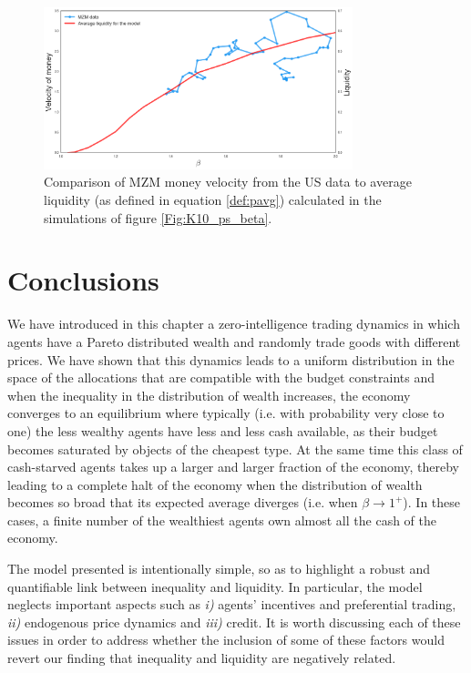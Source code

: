 \begin{figure}%
\centering
\includegraphics[width=0.8\textwidth]{figs_ineq/data_model.png}
\caption{Comparison of MZM money velocity from the US data to average liquidity (as defined in equation \eqref{def:pavg}) calculated in the simulations of figure \ref{Fig:K10_ps_beta}.}
\label{fig:data_model}
\end{figure}

\section{Conclusions}
\label{sec:con}

We have introduced in this chapter a zero-intelligence trading dynamics in which agents have a Pareto distributed wealth and randomly trade goods with different prices. We have shown that this dynamics leads to a uniform distribution in the space of the allocations that are compatible with the budget constraints and when the inequality in the distribution of wealth increases, the economy converges to an equilibrium where typically (i.e. with probability very close to one) the less wealthy agents have less and less cash available, as their budget becomes saturated by objects of the cheapest type. At the same time this class of cash-starved agents takes up a larger and larger fraction of the economy, thereby leading to a complete halt of the economy when the distribution of wealth becomes so broad that its expected average diverges (i.e. when $\beta \to 1^{+}$). In these cases, a finite number of the wealthiest agents own almost all the cash of the economy. 

The model presented is intentionally simple, so as to highlight a robust and quantifiable link between inequality and liquidity. In particular, the model neglects important aspects such as {\em i)} agents' incentives and preferential trading, {\em ii)} endogenous price dynamics and {\em iii)} credit. It is worth discussing each of these issues in order to address whether the inclusion of some of these factors would revert our finding that inequality and liquidity are negatively related. 

